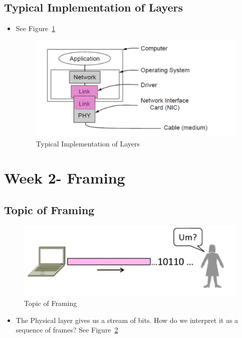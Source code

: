 \documentclass[12pt]{ctexart}   %
\begin{document}
	\subsection{Typical Implementation of Layers}
	\begin{itemize}
		\item See Figure~\ref{fig:2-6-3}
		\begin{figure}[h!] %
		\centering
		 \includegraphics[scale=0.7]{images/2-6-3}
		\caption{ Typical Implementation of Layers}
		 \label{fig:2-6-3}
		 \end{figure}
	\end{itemize}
	
\section{Week 2- Framing}
	\subsection{Topic of Framing}
	
	\begin{figure}[h!] %
	\centering
	 \includegraphics[scale=0.7]{images/2-7-1}
	\caption{Topic of Framing}
	 \label{fig:2-7-1}
	 \end{figure}
	 
	\begin{itemize}
		\item The Physical layer gives us a stream of bits. How do we interpret it as a sequence of frames? See Figure~\ref{fig:2-7-1}
	\end{itemize}
	
\end{document}
